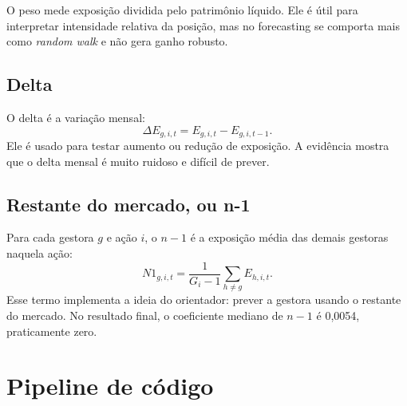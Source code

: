 \documentclass[11pt,a4paper]{article}
\begin{document}
O peso mede exposição dividida pelo patrimônio líquido. Ele é útil para interpretar intensidade relativa da
posição, mas no forecasting se comporta mais como \emph{random walk} e não gera ganho robusto.

\subsection{Delta}

O delta é a variação mensal:
\[
\Delta E_{g,i,t}=E_{g,i,t}-E_{g,i,t-1}.
\]
Ele é usado para testar aumento ou redução de exposição. A evidência mostra que o delta mensal é muito
ruidoso e difícil de prever.

\subsection{Restante do mercado, ou n-1}

Para cada gestora $g$ e ação $i$, o $n-1$ é a exposição média das demais gestoras naquela ação:
\[
N1_{g,i,t}=\frac{1}{G_i-1}\sum_{h\neq g}E_{h,i,t}.
\]
Esse termo implementa a ideia do orientador: prever a gestora usando o restante do mercado. No resultado
final, o coeficiente mediano de $n-1$ é 0,0054, praticamente zero.

\section{Pipeline de código}
\end{document}
